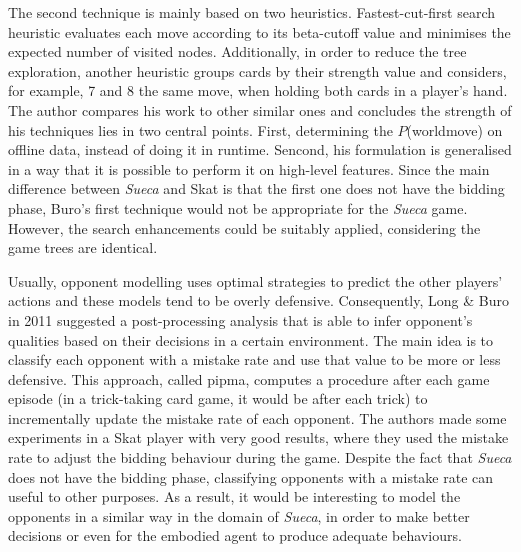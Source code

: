 The second technique is mainly based on two heuristics.
Fastest-cut-first search heuristic evaluates each move according to its beta-cutoff value and minimises the expected number of visited nodes.
Additionally, in order to reduce the tree exploration, another heuristic groups cards by their strength value and considers, for example, 7 and 8 the same move, when holding both cards in a player's hand.
The author compares his work to other similar ones and concludes the strength of his techniques lies in two central points.
First, determining the $P$(world\textbar move) on offline data, instead of doing it in runtime.
Sencond, his formulation is generalised in a way that it is possible to perform it on high-level features.
Since the main difference between \emph{Sueca} and Skat is that the first one does not have the bidding phase, Buro's first technique would not be appropriate for the \emph{Sueca} game.
However, the search enhancements could be suitably applied, considering the game trees are identical.


Usually, opponent modelling uses optimal strategies to predict the other players' actions and these models tend to be overly defensive.
Consequently, Long \& Buro in 2011 \cite{Long2009} suggested a post-processing analysis that is able to infer opponent's qualities based on their decisions in a certain environment.
The main idea is to classify each opponent with a mistake rate and use that value to be more or less defensive.
This approach, called \ac{pipma}, computes a procedure after each game episode (in a trick-taking card game, it would be after each trick) to incrementally update the mistake rate of each opponent.
The authors made some experiments in a Skat player with very good results, where they used the mistake rate to adjust the bidding behaviour during the game.
Despite the fact that \emph{Sueca} does not have the bidding phase, classifying opponents with a mistake rate can useful to other purposes.
As a result, it would be interesting to model the opponents in a similar way in the domain of \emph{Sueca}, in order to make better decisions or even for the embodied agent to produce adequate behaviours.

